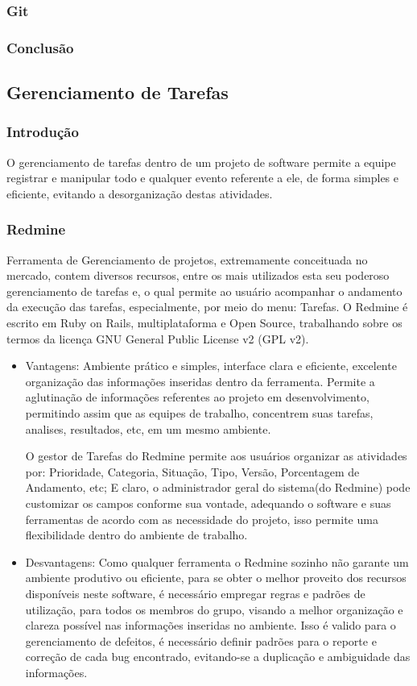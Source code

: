 \documentclass[12pt,a4paper]{article}
\begin{document}
		\subsubsection{Git}
		\subsubsection{Conclusão}

	\clearpage		
	\subsection{Gerenciamento de Tarefas}
		\subsubsection{Introdução}
			O gerenciamento de tarefas dentro de um projeto de software permite a equipe registrar e manipular todo e qualquer evento referente a ele, de forma simples e eficiente, evitando a desorganização destas atividades. 

		\subsubsection{Redmine}
			
			Ferramenta de Gerenciamento de projetos, extremamente conceituada no mercado, contem diversos recursos, entre os mais utilizados esta seu poderoso gerenciamento de tarefas e, o qual permite ao usuário acompanhar o andamento da  execução das tarefas, especialmente, por meio do menu: Tarefas.
			O Redmine é escrito em Ruby on Rails, multiplataforma e Open Source, trabalhando sobre os termos da licença GNU General Public License v2 (GPL v2).
		
		\begin{itemize}
			\item Vantagens: 
			Ambiente prático e simples, interface clara e eficiente, excelente organização das informações inseridas dentro da ferramenta. Permite a aglutinação de informações referentes ao projeto em desenvolvimento, permitindo assim que as equipes de trabalho, concentrem suas tarefas, analises, resultados, etc, em um mesmo ambiente. 
			
			O gestor de Tarefas do Redmine permite aos usuários organizar as atividades por: Prioridade, Categoria, Situação, Tipo, Versão, Porcentagem de Andamento, etc; E claro, o administrador geral do sistema(do Redmine) pode customizar os campos conforme sua vontade, adequando o software e suas ferramentas de acordo com as necessidade do projeto, isso permite uma flexibilidade dentro do ambiente de trabalho.
			\item Desvantagens: 
			Como qualquer ferramenta o Redmine sozinho não garante um ambiente produtivo ou eficiente, para se obter o melhor proveito dos recursos disponíveis neste software, é necessário empregar regras e padrões de utilização, para todos os membros do grupo, visando a melhor organização e clareza possível nas informações inseridas no ambiente. Isso é valido para o gerenciamento de defeitos, é necessário definir padrões para o reporte e correção de cada bug encontrado, evitando-se a duplicação e ambiguidade das informações. 
		\end{itemize}
		
\end{document}
